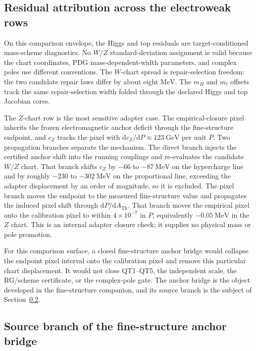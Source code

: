 \documentclass[11pt]{article}
\begin{document}
\subsection{Residual attribution across the electroweak rows}\label{ew-residual-attribution}

On this comparison envelope, the Higgs and top residuals are target-conditioned mass-scheme
diagnostics. No \(W/Z\) standard-deviation assignment is valid because the chart coordinates,
PDG mass-dependent-width parameters, and complex poles use different conventions.
The \(W\)-chart spread is repair-selection freedom: the two candidate repair laws differ by about
eight \(\mathrm{MeV}\). The \(m_H\) and \(m_t\) offsets track the same repair-selection width folded through the
declared Higgs and top Jacobian cores.

The \(Z\)-chart row is the most sensitive adapter case. The empirical-closure pixel inherits
the frozen electromagnetic anchor deficit through the fine-structure endpoint, and \(c_Z\) tracks
the pixel with \(\mathrm{d}c_Z/\mathrm{d}P\approx123~\mathrm{GeV}\) per unit \(P\). Two
propagation branches separate the mechanism. The direct branch injects the certified anchor shift
into the running couplings and re-evaluates the candidate \(W/Z\) chart. That branch shifts
\(c_Z\) by \(-66\) to \(-87~\mathrm{MeV}\) on the hypercharge line and by roughly \(-230\) to
\(-302~\mathrm{MeV}\) on the proportional line, exceeding the adapter displacement by an order of magnitude,
so it is excluded. The pixel branch moves the endpoint to the measured fine-structure value and
propagates the induced pixel shift through \(\mathrm{d}P/\mathrm{d}A_{\mathrm{Th}}\). That branch
moves the empirical pixel onto the calibration pixel to within \(4\times10^{-7}\) in \(P\),
equivalently \(-0.05~\mathrm{MeV}\) in the \(Z\) chart. This is an internal adapter closure check;
it supplies no physical mass or pole promotion.

For this comparison surface, a closed fine-structure anchor bridge would
collapse the endpoint pixel interval onto the calibration pixel and remove
this particular chart displacement. It would not close QT1--QT5, the independent
scale, the RG/scheme certificate, or the complex-pole gate. The anchor bridge is the object developed
in the fine-structure companion, and its source branch is the subject of Section~\ref{ew-anchor-source-branch}.

\subsection{Source branch of the fine-structure anchor bridge}\label{ew-anchor-source-branch}
\end{document}
